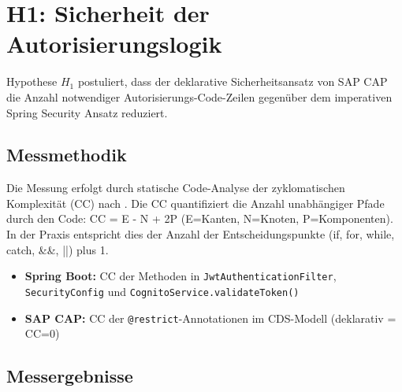 \section{H1: Sicherheit der Autorisierungslogik}

Hypothese $H_1$ postuliert, dass der deklarative Sicherheitsansatz von \ac{SAP
CAP} die Anzahl notwendiger Autorisierungs-Code-Zeilen gegenüber dem
imperativen Spring Security Ansatz reduziert.

\subsection{Messmethodik}

Die Messung erfolgt durch statische Code-Analyse der zyklomatischen Komplexität (CC) nach \citep{McCabe1976}. Die CC quantifiziert die Anzahl unabhängiger Pfade durch den Code: CC = E - N + 2P (E=Kanten, N=Knoten, P=Komponenten). In der Praxis entspricht dies der Anzahl der Entscheidungspunkte (if, for, while, catch, \&\&, ||) plus 1.
\begin{itemize}
    \item \textbf{Spring Boot:} CC der Methoden in \texttt{JwtAuthenticationFilter}, \texttt{SecurityConfig} und \texttt{CognitoService.validateToken()}
    \item \textbf{SAP CAP:} CC der \texttt{@restrict}-Annotationen im \ac{CDS}-Modell (deklarativ = CC=0)
\end{itemize}

\subsection{Messergebnisse}

